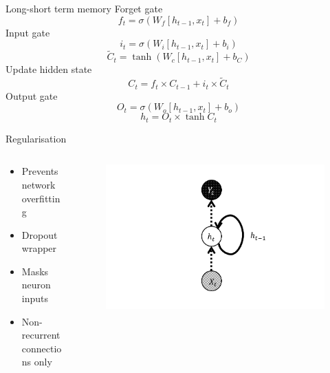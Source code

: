\documentclass{beamer}
\begin{document}
\begin{frame}{Long-short term memory}
  Forget gate
	\[	f_t=\sigma(W_f[h_{t-1},x_t]+b_f) \]
	Input gate
	\[ i_t=\sigma(W_i[h_{t-1},x_t]+b_i) \]
	\[ \tilde{C}_t=\tanh (W_c[h_{t-1},x_t]+b_C) \]
	Update hidden state
	\[ C_t=f_t\times C_{t-1}+i_t\times\tilde{C}_t \]
	Output gate
	\[ O_t=\sigma(W_o[h_{t-1},x_t]+b_o) \]
	\[ h_t=O_t\times\tanh C_t \]
\end{frame}

\begin{frame}{Regularisation}
\begin{columns}[T] %
\begin{column}{.58\textwidth}
\begin{itemize}
  \item Prevents network overfitting
  \item Dropout wrapper \cite{srivastava2014}
  \item Masks neuron inputs
  \item Non-recurrent connections only \cite{zaremba2014}
\end{itemize}
\end{column}%
\hfill%
\begin{column}{.38\textwidth}
\begin{figure}[H]
	\centering
	\includegraphics[width=1\textwidth]{dropout.PNG}
\end{figure}
\end{column}%
\end{columns}
\end{frame}
\end{document}
